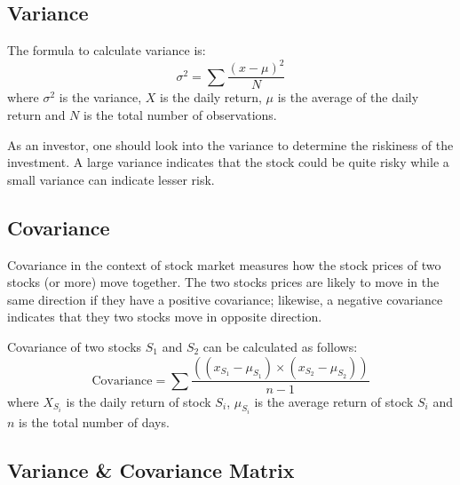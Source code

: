 \subsection{Variance}

The formula to calculate variance is:
\[
  \sigma^2 = \sum \frac{(x-\mu)^2}{N}
\]
where $\sigma^2$ is the variance, $X$ is the daily return, $\mu$ is the average of the daily return and $N$ is the total number of observations.

As an investor, one should look into the variance to determine the riskiness of the investment. A large variance indicates that the stock could be quite risky while a small variance can indicate lesser risk.

\subsection{Covariance}

Covariance in the context of stock market measures how the stock prices of two stocks (or more) move together. The two stocks prices are likely to move in the same direction if they have a positive covariance; likewise, a negative covariance indicates that they two stocks move in opposite direction.


Covariance of two stocks $S_1$ and $S_2$ can be calculated as follows:
\[
  \textrm{Covariance} = \sum \frac{ \left( \left( x_{S_1} - \mu_{S_1} \right) \times \left( x_{S_2} - \mu_{S_2} \right) \right)}{n-1}
\]
where $X_{S_i}$ is the daily return of stock $S_i$, $\mu_{S_i}$ is the average return of stock $S_i$ and $n$ is the total number of days.


\subsection{Variance \& Covariance Matrix}

